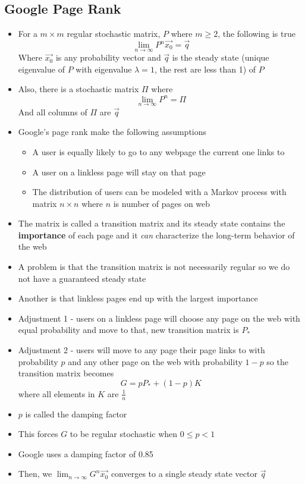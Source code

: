 \documentclass{article}
\begin{document}
\subsection{Google Page Rank}
\begin{itemize}
    \item For a \(m \times  m\) regular stochastic matrix, \(P\) where \(m\geq2\), the following is true 
    \[\lim_{n\to\infty}P^n\vec{x_0}=\vec{q}\] Where \(\vec{x_0}\) is any probability vector and \(\vec{q}\) is the steady state (unique eigenvalue of \(P\) with eigenvalue \(\lambda=1\), the rest are less than 1) of \(P\)
    \item Also, there is a stochastic matrix \(\Pi\) where \[\lim_{n\to\infty}P^n=\Pi\] And all columns of \(\Pi\) are \(\vec{q}\)
    \item Google's page rank make the following assumptions
    \begin{itemize}
        \item A user is equally likely to go to any webpage the current one links to
        \item A user on a linkless page will stay on that page 
        \item The distribution of users can be modeled with a Markov process with matrix \(n \times n\) where \(n\) is number of pages on web 
    \end{itemize}
    \item The matrix is called a transition matrix and its steady state contains the \textbf{importance} of each page and it \emph{can} characterize the long-term behavior of the web 
    \item A problem is that the transition matrix is not necessarily regular so we do not have a guaranteed steady state 
    \item Another is that linkless pages end up with the largest importance
    \item Adjustment 1 - users on a linkless page will choose any page on the web with equal probability and move to that, new transition matrix is \(P_*\)
    \item Adjustment 2 - users will move to any page their page links to with probability \(p\) and any other page on the web with probability \(1-p\) so the transition matrix becomes \[G=pP_* + (1-p)K\] where all elements in \(K\) are \(\frac{1}{n}\)
    \item \(p\) is called the damping factor 
    \item This forces \(G\) to be regular stochastic when \(0\leq p<1\)
    \item Google uses a damping factor of 0.85 
    \item Then, we \(\lim_{n\to\infty}G^n\vec{x_0}\) converges to a single steady state vector \(\vec{q}\)
\end{itemize}
\end{document}
